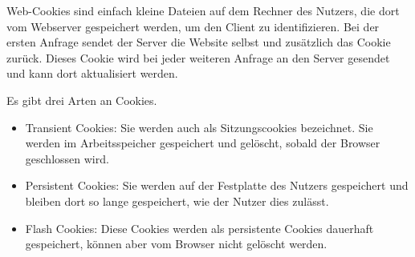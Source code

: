 
Web-Cookies sind einfach kleine Dateien auf dem Rechner des Nutzers, die dort vom Webserver gespeichert werden, um den Client zu identifizieren. Bei der ersten Anfrage sendet der Server die Website selbst und zusätzlich das Cookie zurück. Dieses Cookie wird bei jeder weiteren Anfrage an den Server gesendet und kann dort aktualisiert werden. 

Es gibt drei Arten an Cookies.

\begin{itemize}
    \item Transient Cookies: Sie werden auch als Sitzungscookies bezeichnet. Sie werden im Arbeitsspeicher gespeichert und gelöscht, sobald der Browser geschlossen wird.
    \item Persistent Cookies: Sie werden auf der Festplatte des Nutzers gespeichert und bleiben dort so lange gespeichert, wie der Nutzer dies zulässt.
    \item Flash Cookies: Diese Cookies werden als persistente Cookies dauerhaft gespeichert, können aber vom Browser nicht gelöscht werden. 
\end{itemize}
\cite{w3Cookies}